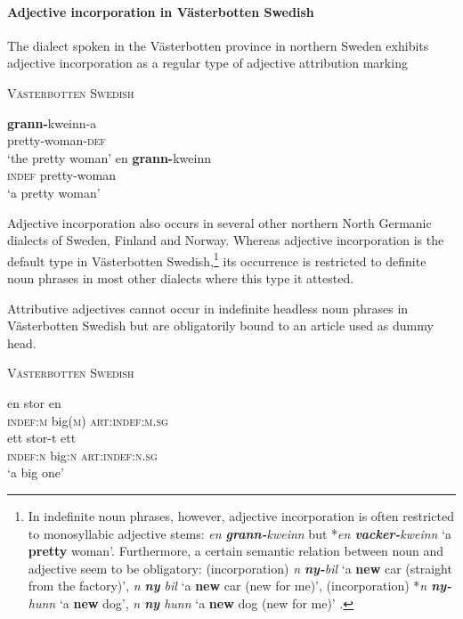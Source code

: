 \paragraph{Adjective incorporation in Västerbotten Swedish} \label{bondska synchr}
The dialect spoken in the Västerbotten province in northern Sweden exhibits adjective incorporation as a regular type of adjective attribution marking
\begin{exe}
\ex \textsc{Västerbotten Swedish} \citep[91–92]{holmberg-etal2003}
\begin{xlist}
\ex
\gll 	\textbf{grann-}kweinn-a\\	
	pretty-woman-\textsc{def}\\
\glt	‘the pretty woman’
\ex
\gll	en \textbf{grann-}kweinn\\
	\textsc{indef} pretty-woman\\
\glt	‘a pretty woman’
\end{xlist}
\end{exe}
Adjective incorporation also occurs in several other northern North Germanic dialects of Sweden, Finland and Norway. Whereas adjective incorporation is the default type in Västerbotten Swedish,\footnote{In indefinite noun phrases, however, adjective incorporation is often restricted to monosyllabic adjective stems: \textit{en \textbf{grann-}kweinn} but *\textit{en \textbf{vacker-}kweinn} ‘a \textbf{pretty} woman’. Furthermore, a certain semantic relation between noun and adjective seem to be obligatory: (incorporation) \textit{n \textbf{ny-}bil} ‘a \textbf{new} car (straight from the factory)’, \textit{n \textbf{ny} bil} ‘a \textbf{new} car (new for me)’, (incorporation) *\textit{n \textbf{ny-}hunn} ‘a \textbf{new} dog’, \textit{n \textbf{ny} hunn} ‘a \textbf{new} dog (new for me)’ \cite[91–92]{holmberg-etal2003}.} its occurrence is restricted to definite noun phrases in most other dialects where this type it attested.

Attributive adjectives cannot occur in indefinite headless noun phrases in Västerbotten Swedish but are obligatorily bound to an article used as dummy head.
\begin{exe}
\ex \textsc{Västerbotten Swedish} \citep{holmberg-etal2003,delsing1996}
\begin{xlist}
\ex
\gll 	en stor en\\	
	\textsc{indef:m} big(\textsc{m}) \textsc{art:indef:m.sg}\\
\ex
\gll 	ett stor-t ett\\	
	\textsc{indef:n} big:\textsc{n} \textsc{art:indef:n.sg}\\
\glt	‘a big one’
\end{xlist}
\end{exe}

